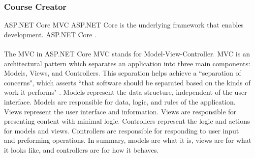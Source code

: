 \subsubsection{Course Creator}
ASP.NET Core MVC  ASP.NET Core is the underlying framework that enables development. ASP.NET Core .\\
\\
The MVC in ASP.NET Core MVC stands for Model-View-Controller. MVC is an architectural pattern which separates an application into three main components: Models, Views, and Controllers. This separation helps achieve a ``separation of concerns", which asserts ``that software should be separated based on the kinds of work it performs" \cite{separationOfConcerns}. Models represent the data structure, independent of the user interface. Models are responsible for data, logic, and rules of the application. Views represent the user interface and information. Views are responsible for presenting content with minimal logic. Controllers represent the logic and actions for models and views. Controllers are responsible for responding to user input and preforming operations. In summary, models are what it is, views are for what it looks like, and controllers are for how it behaves. \\
\\
